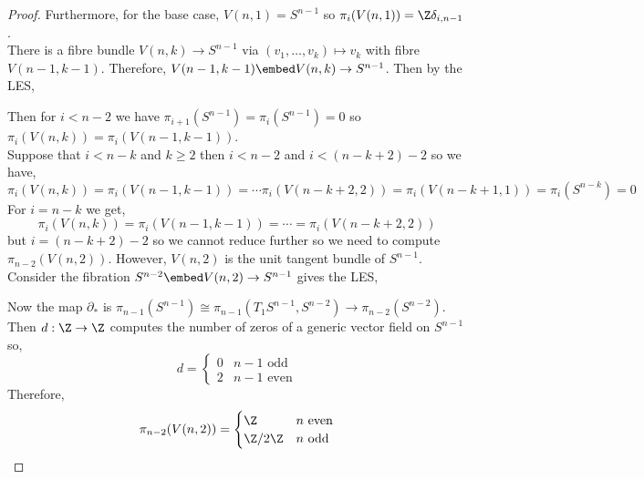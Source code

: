 \documentclass[12pt]{extarticle}
\begin{document}
\begin{proof}
Furthermore, for the base case, $V(n, 1) = S^{n-1}$ so $\pi_i(V(n,1)) = \Z \delta_{i,n-1}$.
\bigskip\\
There is a fibre bundle $V(n, k) \to S^{n-1}$ via $(v_1, \dots, v_k) \mapsto v_k$ with fibre $V(n-1, k-1)$. Therefore, $V(n-1, k-1) \embed V(n,k) \to S^{n-1}$. Then by the LES,
\begin{center}
\end{center}
Then for $i < n - 2$ we have $\pi_{i+1}(S^{n-1}) = \pi_{i}(S^{n-1}) = 0$ so $\pi_i(V(n, k)) = \pi_i(V(n-1, k -1))$.
\bigskip\\
Suppose that $i < n - k$ and $k \ge 2$ then $i < n - 2$ and $i < (n - k + 2) - 2$ so we have,
\[ \pi_i(V(n, k)) = \pi_i(V(n-1, k-1)) = \cdots \pi_i(V(n - k + 2, 2)) = \pi_i(V(n-k + 1, 1)) = \pi_i(S^{n-k}) = 0 \]
For $i = n - k$ we get,
\[ \pi_i(V(n, k)) = \pi_i(V(n-1, k-1)) = \cdots = \pi_i(V(n - k + 2, 2)) \]
but $i = (n - k + 2) - 2$ so we cannot reduce further
so we need to compute $\pi_{n-2}(V(n,2))$. However, $V(n,2)$ is the unit tangent bundle of $S^{n-1}$. Consider the fibration $S^{n-2} \embed V(n,2) \to S^{n-1}$ gives the LES,
\begin{center}
\end{center}
Now the map $\partial_*$ is $\pi_{n-1}(S^{n-1}) \cong \pi_{n-1}(T_1 S^{n-1}, S^{n-2}) \to \pi_{n-2}(S^{n-2})$. Then $d : \Z \to \Z$ computes the number of zeros of a generic vector field on $S^{n-1}$ so,
\[ d = 
\begin{cases}
0 & n - 1 \text{ odd}
\\
2 & n - 1 \text{ even}
\end{cases} \]
Therefore,
\[ \pi_{n-2}(V(n, 2)) = 
\begin{cases}
\Z & n \text{ even}
\\
\Z / 2 \Z & n \text{ odd}
\end{cases} \] 
\end{proof}
\end{document}
